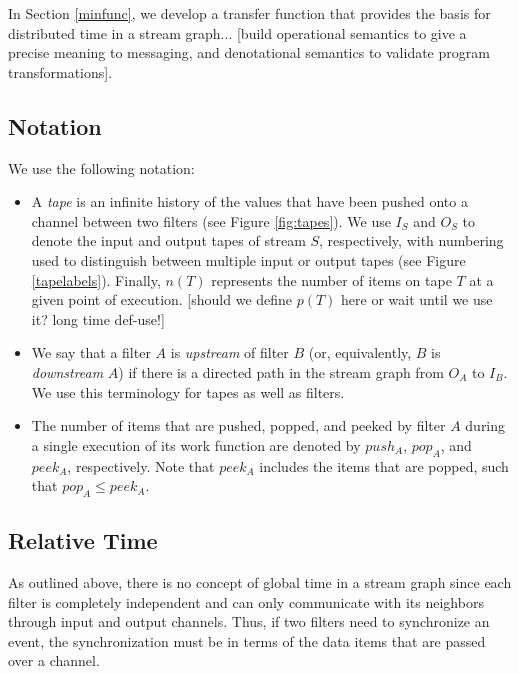 In Section \ref{minfunc}, we develop a transfer function that provides
the basis for distributed time in a stream graph... [build operational
semantics to give a precise meaning to messaging, and denotational
semantics to validate program transformations].

\subsection{Notation}

We use the following notation:

\begin{itemize}

\item A {\it tape} is an infinite history of the values that have been
  pushed onto a channel between two filters (see Figure
  \ref{fig:tapes}).  We use $I_S$ and $O_S$ to denote the input and
  output tapes of stream $S$, respectively, with numbering used to
  distinguish between multiple input or output tapes (see Figure
  \ref{tapelabels}).  Finally, $n(T)$ represents the number of items
  on tape $T$ at a given point of execution.  [should we define $p(T)$
  here or wait until we use it?  long time def-use!]

\item We say that a filter $A$ is {\it upstream} of filter $B$ (or,
  equivalently, $B$ is {\it downstream} $A$) if there is a directed
  path in the stream graph from $O_A$ to $I_B$.  We use this
  terminology for tapes as well as filters.

\item The number of items that are pushed, popped, and peeked by
  filter $A$ during a single execution of its work function are
  denoted by $push_A$, $pop_A$, and $peek_A$, respectively.  Note that
  $peek_A$ includes the items that are popped, such that $pop_A \le
  peek_A$.

\end{itemize}

\subsection{Relative Time}
\label{sec:minfunc}

As outlined above, there is no concept of global time in a stream
graph since each filter is completely independent and can only
communicate with its neighbors through input and output channels.
Thus, if two filters need to synchronize an event, the synchronization
must be in terms of the data items that are passed over a channel.

